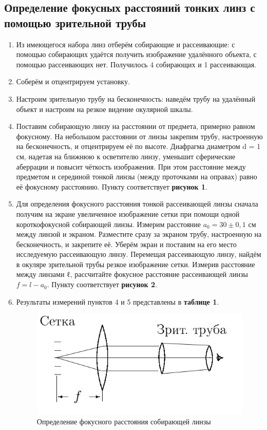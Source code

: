 \documentclass[a4paper,12pt]{article} %
\begin{document}
\subsection{Определение фокусных расстояний тонких линз с помощью зрительной трубы}
\begin{enumerate}
    \item Из имеющегося набора линз отберём собирающие и рассеивающие: с помощью собирающих удаётся получить изображение удалённого объекта, с помощью рассеивающих нет. Получилось 4 собирающих и 1 рассеивающая.
    \item Соберём и отцентрируем установку.
    \item Настроим зрительную трубу на бесконечность: наведём трубу на удалённый объект и настроим на резкое видение окулярной шкалы.
    \item  Поставим собирающую линзу на расстоянии от предмета, примерно равном фокусному. На небольшом расстоянии от линзы закрепим трубу, настроенную на бесконечность, и отцентрируем её по высоте. Диафрагма диаметром d = 1 см, надетая на ближнюю к осветителю линзу, уменьшит сферические аберрации и повысит чёткость изображения. При этом расстояние между предметом и серединой тонкой линзы (между проточками на оправах) равно её фокусному расстоянию. Пункту соответствует \textbf{рисунок 1}.
    \item Для определения фокусного расстояния тонкой рассеивающей линзы сначала получим на экране увеличенное изображение сетки при помощи одной короткофокусной собирающей линзы. Измерим расстояние $a_{0} = 30 \pm 0,1$ см между линзой и экраном. Разместите сразу за экраном трубу, настроенную на бесконечность, и
закрепите её. Уберём экран и поставим на его место исследуемую рассеивающую линзу. Перемещая рассеивающую линзу, найдём в окуляре зрительной трубы резкое изображение сетки. Измерив расстояние между линзами ℓ, рассчитайте фокусное расстояние рассеивающей линзы $f = l - a_{0}$. Пункту соответствует \textbf{рисунок 2}.

\item Результаты измерений пунктов 4 и 5 представлены в \textbf{таблице 1}.
	\begin{figure}[h]
 \centering
 \includegraphics[scale=0.8]{lab_pic1.jpg}
		\caption{Определение фокусного расстояния собирающей линзы}
		

\end{figure}
\end{enumerate}
\end{document}
